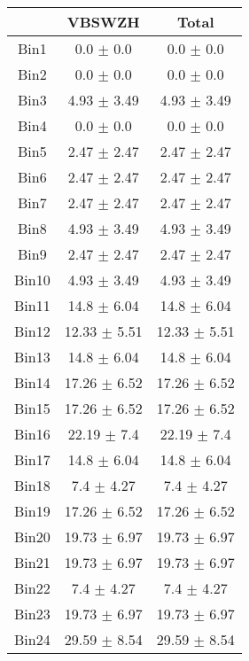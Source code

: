   \begin{tabular}{|c|c|c|}
  \hline
      & VBSWZH & Total \\ \cline{1-3} 
     \hline\hline
     Bin1 & 0.0 $\pm$ 0.0 & 0.0 $\pm$ 0.0 \\ \cline{1-3} 
     Bin2 & 0.0 $\pm$ 0.0 & 0.0 $\pm$ 0.0 \\ \cline{1-3} 
     Bin3 & 4.93 $\pm$ 3.49 & 4.93 $\pm$ 3.49 \\ \cline{1-3} 
     Bin4 & 0.0 $\pm$ 0.0 & 0.0 $\pm$ 0.0 \\ \cline{1-3} 
     Bin5 & 2.47 $\pm$ 2.47 & 2.47 $\pm$ 2.47 \\ \cline{1-3} 
     Bin6 & 2.47 $\pm$ 2.47 & 2.47 $\pm$ 2.47 \\ \cline{1-3} 
     Bin7 & 2.47 $\pm$ 2.47 & 2.47 $\pm$ 2.47 \\ \cline{1-3} 
     Bin8 & 4.93 $\pm$ 3.49 & 4.93 $\pm$ 3.49 \\ \cline{1-3} 
     Bin9 & 2.47 $\pm$ 2.47 & 2.47 $\pm$ 2.47 \\ \cline{1-3} 
     Bin10 & 4.93 $\pm$ 3.49 & 4.93 $\pm$ 3.49 \\ \cline{1-3} 
     Bin11 & 14.8 $\pm$ 6.04 & 14.8 $\pm$ 6.04 \\ \cline{1-3} 
     Bin12 & 12.33 $\pm$ 5.51 & 12.33 $\pm$ 5.51 \\ \cline{1-3} 
     Bin13 & 14.8 $\pm$ 6.04 & 14.8 $\pm$ 6.04 \\ \cline{1-3} 
     Bin14 & 17.26 $\pm$ 6.52 & 17.26 $\pm$ 6.52 \\ \cline{1-3} 
     Bin15 & 17.26 $\pm$ 6.52 & 17.26 $\pm$ 6.52 \\ \cline{1-3} 
     Bin16 & 22.19 $\pm$ 7.4 & 22.19 $\pm$ 7.4 \\ \cline{1-3} 
     Bin17 & 14.8 $\pm$ 6.04 & 14.8 $\pm$ 6.04 \\ \cline{1-3} 
     Bin18 & 7.4 $\pm$ 4.27 & 7.4 $\pm$ 4.27 \\ \cline{1-3} 
     Bin19 & 17.26 $\pm$ 6.52 & 17.26 $\pm$ 6.52 \\ \cline{1-3} 
     Bin20 & 19.73 $\pm$ 6.97 & 19.73 $\pm$ 6.97 \\ \cline{1-3} 
     Bin21 & 19.73 $\pm$ 6.97 & 19.73 $\pm$ 6.97 \\ \cline{1-3} 
     Bin22 & 7.4 $\pm$ 4.27 & 7.4 $\pm$ 4.27 \\ \cline{1-3} 
     Bin23 & 19.73 $\pm$ 6.97 & 19.73 $\pm$ 6.97 \\ \cline{1-3} 
     Bin24 & 29.59 $\pm$ 8.54 & 29.59 $\pm$ 8.54 \\ \cline{1-3} 

\end{tabular}
